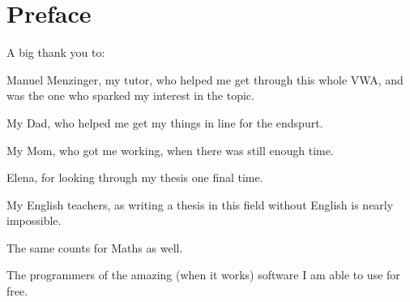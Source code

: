 \chapter*{Preface}
A big thank you to:

Manuel Menzinger, my tutor, who helped me get through this whole VWA, and was the one who sparked my interest in the topic.

My Dad, who helped me get my things in line for the endspurt.

My Mom, who got me working, when there was still enough time.

Elena, for looking through my thesis one final time.

My English teachers, as writing a thesis in this field without English is nearly impossible.

The same counts for Maths as well.

The programmers of the amazing (when it works) software I am able to use for free.

